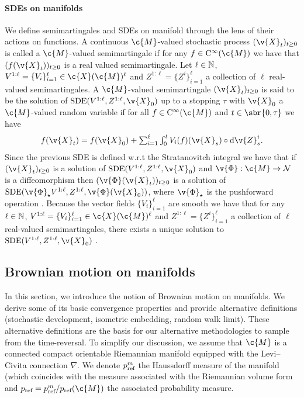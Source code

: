 \paragraph{SDEs on manifolds}
We define semimartingales and SDEs on manifold through the lens of their actions on functions.
A continuous $\c{M}$-valued stochastic process $(\v{X}_t)_{t \geq 0}$ is called a $\c{M}$-valued semimartingale if for any $f \in \mathrm{C}^\infty(\c{M})$ we have that $(f(\v{X}_t))_{t \geq 0}$ is a real valued semimartingale.
Let $\ell \in \mathbb{N}$, $V^{1:\ell} = \{ V_i\}_{i=1}^\ell \in \c{X}(\c{M})^\ell$ and $Z^{1:\ell} = \{Z^i\}_{i=1}^\ell$ a collection of $\ell$ real-valued semimartingales.
A $\c{M}$-valued semimartingale $(\v{X}_t)_{t \geq 0}$ is said to be the solution of $\mathrm{SDE}(V^{1:\ell}, Z^{1:\ell}, \v{X}_0)$ up to a stopping $\tau$ with $\v{X}_0$ a $\c{M}$-valued random variable if for all $f \in \mathrm{C}^\infty(\c{M})$ and $t \in \sbr{0, \tau}$ we have \begin{equation} \textstyle{f(\v{X}_t) = f(\v{X}_0) + \sum_{i=1}^\ell \int_0^t V_i(f)(\v{X}_s) \circ \mathrm{d} \v{Z}^i_s .
	}
\end{equation}
Since the previous SDE is defined w.r.t the Stratanovitch integral we have that if $(\v{X}_t)_{t \geq 0}$ is a solution of $\mathrm{SDE}(V^{1:\ell}, Z^{1:\ell}, \v{X}_0)$ and $\v{\Phi}: \c{M} \to \mathcal{N}$ is a diffeomorphism then $(\v{\Phi}(\v{X}_t))_{t \geq 0}$ is a solution of $\mathrm{SDE}(\v{\Phi}_\star V^{1:\ell}, Z^{1:\ell}, \v{\Phi}(\v{X}_0))$, where $\v{\Phi}_\star$ is the pushforward operation \cite[see][Proposition 1.2.4]{hsu2002stochastic}.
Because the vector fields $\{V_i\}_{i=1}^\ell$ are smooth we have that for any $\ell \in \mathbb{N}$, $V^{1:\ell} = \{ V_i\}_{i=1}^\ell \in \c{X}(\c{M})^\ell$ and $Z^{1:\ell} = \{Z^i\}_{i=1}^\ell$ a collection of $\ell$ real-valued semimartingales, there exists a unique solution to $\mathrm{SDE}(V^{1:\ell}, Z^{1:\ell}, \v{X}_0)$ \cite[see][Theorem 1.2.9]{hsu2002stochastic}.

\subsection{Brownian motion on manifolds}
\label{sec:brown-moti-manif}

In this section, we introduce the notion of Brownian motion on manifolds.
We derive some of its basic convergence properties and provide alternative definitions (stochastic development, isometric embedding, random walk limit).
These alternative definitions are the basis for our alternative methodologies to sample from the time-reversal.
To simplify our discussion, we assume that $\c{M}$ is a connected compact orientable Riemannian manifold equipped with the Levi--Civita connection $\nabla$.
We denote $p_{\textup{ref}}^m$ the Haussdorff measure of the manifold (which coincides with the measure associated with the Riemannian volume form \parencite[see][Theorem 2.10.10]{federer2014geometric} and $p_{\textup{ref}} = p_{\textup{ref}}^m / p_{\textup{ref}}(\c{M})$ the associated probability measure.

